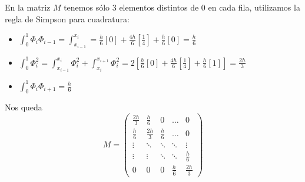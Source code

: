 	En la matriz $M$ tenemos sólo 3 elementos distintos de 0 en cada fila, utilizamos la regla de Simpson para cuadratura:
	\begin{itemize}
		\item $\int_0^1 \Phi_i\Phi_{i-1} = \int_{x_{i-1}}^{x_i} = \frac{h}{6}[0] + \frac{4h}{6}[\frac{1}{4}]+\frac{h}{6}[0] = \frac{h}{6}$
		
		\item $\int_0^1 \Phi_i^2 = \int_{x_{i-1}}^{x_i} \Phi_i^2
		+ \int_{x_{i}}^{x_{i+1}} \Phi_i^2 = 2[\frac{h}{6}[0] + \frac{4h}{6}[\frac{1}{4}]+\frac{h}{6}[1]] = \frac{2h}{3}$
		\item $\int_0^1\Phi_i\Phi_{i+1} = \frac{h}{6}$
	\end{itemize}
	
	Nos queda 
	\begin{equation*}
		M = \begin{pmatrix}
			\frac{2h}{3} & \frac{h}{6} & 0 & \hdots & 0\\
			\frac{h}{6} & \frac{2h}{3} & \frac{h}{6} & \hdots & 0\\
			\vdots & \ddots & \ddots & \ddots & \vdots\\
			\vdots & \vdots & \ddots & \ddots &  \frac{h}{6}\\
			0 & 0 & 0 & \frac{h}{6} & \frac{2h}{3}
		\end{pmatrix}
	\end{equation*}
	
	